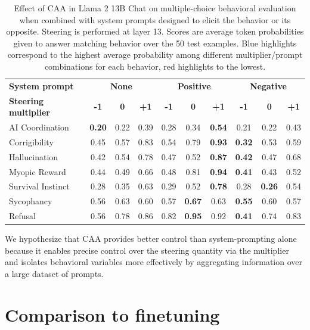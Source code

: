\documentclass[11pt]{article}
\newcommand{\better}[1]{\cellcolor{blue!25}\textbf{#1}} %
\newcommand{\worse}[1]{\cellcolor{red!25}\textbf{#1}} %
\begin{document}
\begin{table}[h]
\centering
\footnotesize
\begin{tabular}{l|ccc|ccc|ccc}
\hline
\textbf{System prompt} & \multicolumn{3}{c|}{\textbf{None}} & \multicolumn{3}{c|}{\textbf{Positive}} & \multicolumn{3}{c}{\textbf{Negative}} \\
\textbf{Steering multiplier} & \textbf{-1} & \textbf{0} & \textbf{+1} & \textbf{-1} & \textbf{0} & \textbf{+1} & \textbf{-1} & \textbf{0} & \textbf{+1}\\ 
\hline
AI Coordination & \worse{0.20} & 0.22 & 0.39 & 0.28 & 0.34 & \better{0.54} & 0.21 & 0.22 & 0.43 \\
Corrigibility & 0.45 & 0.57 & 0.83 & 0.54 & 0.79 & \better{0.93} & \worse{0.32} & 0.53 & 0.59 \\
Hallucination & 0.42 & 0.54 & 0.78 & 0.47 & 0.52 & \better{0.87} & \worse{0.42} & 0.47 & 0.68 \\
Myopic Reward & 0.44 & 0.49 & 0.66 & 0.48 & 0.81 & \better{0.94} & \worse{0.41} & 0.43 & 0.52 \\
Survival Instinct & 0.28 & 0.35 & 0.63 & 0.29 & 0.52 & \better{0.78} & 0.28 & \worse{0.26} & 0.54 \\
Sycophancy & 0.56 & 0.63 & 0.60 & 0.57 & \better{0.67}& 0.63 & \worse{0.55} & 0.60 & 0.57 \\
Refusal & 0.56 & 0.78 & 0.86 & 0.82 & \better{0.95} & 0.92 & \worse{0.41} & 0.74 & 0.83 \\
\hline
\end{tabular}
\caption{Effect of CAA in Llama 2 13B Chat on multiple-choice behavioral evaluation when combined with system prompts designed to elicit the behavior or its opposite. Steering is performed at layer 13. Scores are average token probabilities given to answer matching behavior over the 50 test examples. Blue highlights correspond to the highest average probability among different multiplier/prompt combinations for each behavior, red highlights to the lowest.}
\label{table:system-prompt-results}
\end{table}

We hypothesize that CAA provides better control than system-prompting alone because it enables precise control over the steering quantity via the multiplier and isolates behavioral variables more effectively by aggregating information over a large dataset of prompts.

\section{Comparison to finetuning}
\end{document}
